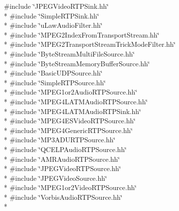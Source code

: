 {\ttfamily \#include \char`\"{}J\+P\+E\+G\+Video\+R\+T\+P\+Sink.\+hh\char`\"{}}\\*
{\ttfamily \#include \char`\"{}Simple\+R\+T\+P\+Sink.\+hh\char`\"{}}\\*
{\ttfamily \#include \char`\"{}u\+Law\+Audio\+Filter.\+hh\char`\"{}}\\*
{\ttfamily \#include \char`\"{}M\+P\+E\+G2\+Index\+From\+Transport\+Stream.\+hh\char`\"{}}\\*
{\ttfamily \#include \char`\"{}M\+P\+E\+G2\+Transport\+Stream\+Trick\+Mode\+Filter.\+hh\char`\"{}}\\*
{\ttfamily \#include \char`\"{}Byte\+Stream\+Multi\+File\+Source.\+hh\char`\"{}}\\*
{\ttfamily \#include \char`\"{}Byte\+Stream\+Memory\+Buffer\+Source.\+hh\char`\"{}}\\*
{\ttfamily \#include \char`\"{}Basic\+U\+D\+P\+Source.\+hh\char`\"{}}\\*
{\ttfamily \#include \char`\"{}Simple\+R\+T\+P\+Source.\+hh\char`\"{}}\\*
{\ttfamily \#include \char`\"{}M\+P\+E\+G1or2\+Audio\+R\+T\+P\+Source.\+hh\char`\"{}}\\*
{\ttfamily \#include \char`\"{}M\+P\+E\+G4\+L\+A\+T\+M\+Audio\+R\+T\+P\+Source.\+hh\char`\"{}}\\*
{\ttfamily \#include \char`\"{}M\+P\+E\+G4\+L\+A\+T\+M\+Audio\+R\+T\+P\+Sink.\+hh\char`\"{}}\\*
{\ttfamily \#include \char`\"{}M\+P\+E\+G4\+E\+S\+Video\+R\+T\+P\+Source.\+hh\char`\"{}}\\*
{\ttfamily \#include \char`\"{}M\+P\+E\+G4\+Generic\+R\+T\+P\+Source.\+hh\char`\"{}}\\*
{\ttfamily \#include \char`\"{}M\+P3\+A\+D\+U\+R\+T\+P\+Source.\+hh\char`\"{}}\\*
{\ttfamily \#include \char`\"{}Q\+C\+E\+L\+P\+Audio\+R\+T\+P\+Source.\+hh\char`\"{}}\\*
{\ttfamily \#include \char`\"{}A\+M\+R\+Audio\+R\+T\+P\+Source.\+hh\char`\"{}}\\*
{\ttfamily \#include \char`\"{}J\+P\+E\+G\+Video\+R\+T\+P\+Source.\+hh\char`\"{}}\\*
{\ttfamily \#include \char`\"{}J\+P\+E\+G\+Video\+Source.\+hh\char`\"{}}\\*
{\ttfamily \#include \char`\"{}M\+P\+E\+G1or2\+Video\+R\+T\+P\+Source.\+hh\char`\"{}}\\*
{\ttfamily \#include \char`\"{}Vorbis\+Audio\+R\+T\+P\+Source.\+hh\char`\"{}}\\*
